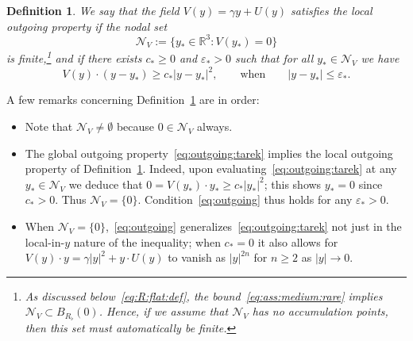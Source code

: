 \documentclass[11pt,reqno]{amsproc}
\numberwithin{equation}{section}
\newtheorem{definition}[theorem]{Definition}
\theoremstyle{remark}
\begin{document}
\begin{definition}
\label{def:outgoing}
We say that the field $V(y) = \gamma y + U(y)$ satisfies the \emph{local outgoing property} if the nodal set
\[
\mathcal{N}_V := \{ y_* \in \mathbb{R}^3 \colon V(y_*)  = 0\}
\]
is finite,\footnote{As discussed below~\eqref{eq:R:flat:def}, the bound~\eqref{eq:ass:medium:rare} implies $\mathcal{N}_V \subset B_{R_\flat}(0)$. Hence, if we assume that $\mathcal{N}_V$ has \textit{no accumulation points}, then this set must automatically be finite.} and if there exists $c_* \geq 0$ and $\varepsilon_*>0$ such that for all $y_* \in \mathcal{N}_V$ we have
\begin{equation}
\label{eq:outgoing}
V(y) \cdot (y-y_*) \geq c_* |y-y_*|^2,
\qquad
\mbox{when}
\qquad |y-y_*|\leq \varepsilon_*.
\end{equation}
\end{definition}
A few remarks concerning Definition~\ref{def:outgoing} are in order:
\begin{itemize}[leftmargin=2em]
\item Note that $\mathcal{N}_V \neq \emptyset$ because $0 \in \mathcal{N}_V$ always. 
\item The global outgoing property~\eqref{eq:outgoing:tarek} implies the local outgoing property of Definition~\ref{def:outgoing}. Indeed, upon evaluating~\eqref{eq:outgoing:tarek}  at any  $y_* \in \mathcal{N}_V$ we deduce that $0 = V(y_*) \cdot y_* \geq c_* |y_*|^2$; this shows $y_*=0$ since $c_*>0$. Thus $\mathcal{N}_V = \{0\}$. Condition~\eqref{eq:outgoing} thus holds for any $\varepsilon_* >0$. 
\item When $\mathcal{N}_V = \{0\}$,~\eqref{eq:outgoing} generalizes~\eqref{eq:outgoing:tarek} not just in the local-in-$y$ nature of the inequality; when $c_*=0$ it also allows for $V(y) \cdot y = \gamma |y|^2 + y \cdot U(y)$ to vanish as $|y|^{2n}$ for $n\geq 2$ as $|y|\to 0$.
\end{itemize}
\end{document}
